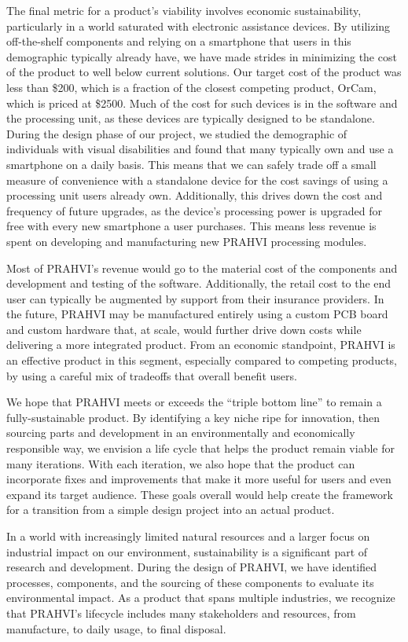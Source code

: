 	The final metric for a product's viability involves economic sustainability, particularly in a world saturated with electronic assistance devices. By utilizing off-the-shelf components and relying on a smartphone that users in this demographic typically already have, we have made strides in minimizing the cost of the product to well below current solutions. Our target cost of the product was less than \$200, which is a fraction of the closest competing product, OrCam, which is priced at \$2500. Much of the cost for such devices is in the software and the processing unit, as these devices are typically designed to be standalone. During the design phase of our project, we studied the demographic of individuals with visual disabilities and found that many typically own and use a smartphone on a daily basis. This means that we can safely trade off a small measure of convenience with a standalone device for the cost savings of using a processing unit users already own. Additionally, this drives down the cost and frequency of future upgrades, as the device's processing power is upgraded for free with every new smartphone a user purchases. This means less revenue is spent on developing and manufacturing new PRAHVI processing modules.
	
	Most of PRAHVI's revenue would go to the material cost of the components and development and testing of the software. Additionally, the retail cost to the end user can typically be augmented by support from their insurance providers. In the future, PRAHVI may be manufactured entirely using a custom PCB board and custom hardware that, at scale, would further drive down costs while delivering a more integrated product. From an economic standpoint, PRAHVI is an effective product in this segment, especially compared to competing products, by using a careful mix of tradeoffs that overall benefit users.
	
	We hope that PRAHVI meets or exceeds the “triple bottom line” to remain a fully-sustainable product. By identifying a key niche ripe for innovation, then sourcing parts and development in an environmentally and economically responsible way, we envision a life cycle that helps the product remain viable for many iterations. With each iteration, we also hope that the product can incorporate fixes and improvements that make it more useful for users and even expand its target audience. These goals overall would help create the framework for a transition from a simple design project into an actual product.
	
	In a world with increasingly limited natural resources and a larger focus on industrial impact on our environment, sustainability is a significant part of research and development. During the design of PRAHVI, we have identified processes, components, and the sourcing of these components to evaluate its environmental impact. As a product that spans multiple industries, we recognize that PRAHVI's lifecycle includes many stakeholders and resources, from manufacture, to daily usage, to final disposal.
	
